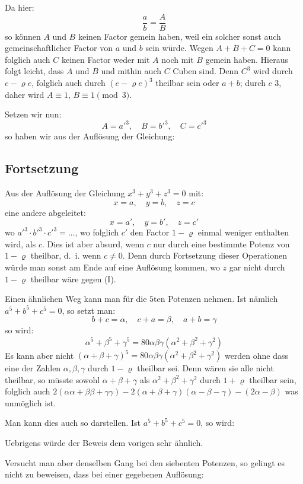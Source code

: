 \documentclass[12pt,a4paper]{article}
\begin{document}
Da hier:
\[
\frac{a}{b} = \frac{A}{B}
\]
so können $A$ und $B$ keinen Factor gemein haben, weil ein solcher sonst auch gemeinschaftlicher Factor von $a$ und $b$ sein würde. Wegen $A + B + C = 0$ kann folglich auch $C$ keinen Factor weder mit $A$ noch mit $B$ gemein haben. Hieraus folgt leicht, dass $A$ und $B$ und mithin auch $C$ Cuben sind. Denn $C^3$ wird durch $e - \varrho e$, folglich auch durch $(e - \varrho e)^3$ theilbar sein oder $a + b$; durch $c$ $3$, daher wird $A \equiv 1$, $B \equiv 1 \pmod{3}$.

Setzen wir nun:
\[
A = a'^3, \quad B = b'^3, \quad C = c'^3
\]
so haben wir aus der Auflösung der Gleichung:

\subsection*{Fortsetzung}

Aus der Auflösung der Gleichung $x^3 + y^3 + z^3 = 0$ mit:
\[
x = a, \quad y = b, \quad z = c
\]
eine andere abgeleitet:
\[
x = a', \quad y = b', \quad z = c'
\]
wo $a'^3 \cdot b'^3 \cdot c'^3 = \ldots$, wo folglich $c'$ den Factor $1 - \varrho$ einmal weniger enthalten wird, als $c$. Dies ist aber absurd, wenn $c$ nur durch eine bestimmte Potenz von $1 - \varrho$ theilbar, d.~i. wenn $c \neq 0$. Denn durch Fortsetzung dieser Operationen würde man sonst am Ende auf eine Auflösung kommen, wo $z$ gar nicht durch $1 - \varrho$ theilbar wäre gegen (I).

Einen ähnlichen Weg kann man für die $5$ten Potenzen nehmen. Ist nämlich $a^5 + b^5 + c^5 = 0$, so setzt man:
\[
b + c = \alpha, \quad c + a = \beta, \quad a + b = \gamma
\]
so wird:
\[
\alpha^5 + \beta^5 + \gamma^5 = 80\alpha\beta\gamma(\alpha^2 + \beta^2 + \gamma^2)
\]
Es kann aber nicht $(\alpha + \beta + \gamma)^5 = 80\alpha\beta\gamma(\alpha^2 + \beta^2 + \gamma^2)$ werden ohne dass eine der Zahlen $\alpha, \beta, \gamma$ durch $1 - \varrho$ theilbar sei. Denn wären sie alle nicht theilbar, so müsste sowohl $\alpha + \beta + \gamma$ als $\alpha^2 + \beta^2 + \gamma^2$ durch $1 + \varrho$ theilbar sein, folglich auch $2(\alpha\alpha + \beta\beta + \gamma\gamma) - 2(\alpha + \beta + \gamma)(\alpha - \beta - \gamma) - (2\alpha - \beta)$ was unmöglich ist.

Man kann dies auch so darstellen. Ist $a^5 + b^5 + c^5 = 0$, so wird:

Uebrigens würde der Beweis dem vorigen sehr ähnlich.

Versucht man aber denselben Gang bei den siebenten Potenzen, so gelingt es nicht zu beweisen, dass bei einer gegebenen Auflösung:
\end{document}
